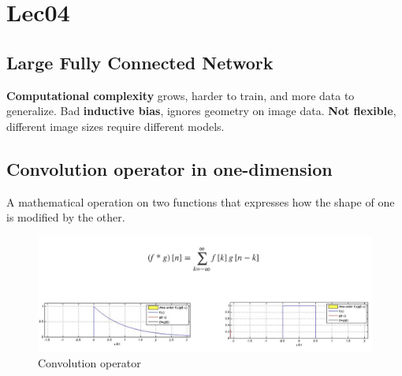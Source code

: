 \documentclass[11pt, english]{article}
\begin{document}
\section{Lec04}
\subsection{Large Fully Connected Network}
\textbf{Computational complexity} grows, harder to train, and more data to generalize.
Bad\textbf{ inductive bias}, ignores geometry on image data.
\textbf{Not flexible}, different image sizes require different models.
\subsection{Convolution operator in one-dimension}
A mathematical operation on two functions that expresses how the shape of one is modified by the other.
\begin{figure}[H]
    \centering
    \includegraphics[width=0.7\linewidth]{convolution.png}
    \caption{Convolution operator}
    \label{fig:enter-label}
\end{figure}
\end{document}
